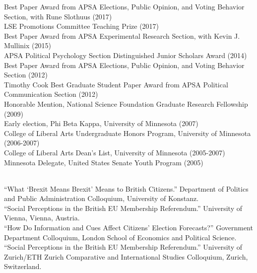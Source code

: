 \documentclass[12pt]{article}
\renewcommand{\section}[1]{\pagebreak[3]%
    \llap{\scshape\smash{\parbox[t]{\marginparwidth}{\raggedright {\color{lg}#1}}}}%
    \vspace{-\baselineskip}\par}
\newcommand{\topic}[1]{\pagebreak[3]\indent {\color{lg}{\footnotesize #1 }}\\}
\newcommand{\entry}[1]{\indent {\color{lg}\guillemotright}\hspace{2pt}#1\vspace{.25em}\\}
\begin{document}
\section{Honors \&\\Awards}
	\entry{Best Paper Award from APSA Elections, Public Opinion, and Voting Behavior Section, with Rune Slothuus (2017)}
	\entry{LSE Promotions Committee Teaching Prize (2017)}
    \entry{Best Paper Award from APSA Experimental Research Section, with Kevin J. Mullinix (2015)}
	\entry{APSA Political Psychology Section Distinguished Junior Scholars Award (2014)}
	\entry{Best Paper Award from APSA Elections, Public Opinion, and Voting Behavior Section (2012)}
	\entry{Timothy Cook Best Graduate Student Paper Award from APSA Political Communication Section (2012)}
	\entry{Honorable Mention, National Science Foundation Graduate Research Fellowship (2009)}
	\entry{Early election, Phi Beta Kappa, University of Minnesota (2007)}
	\entry{College of Liberal Arts Undergraduate Honors Program, University of Minnesota (2006-2007)}
	\entry{College of Liberal Arts Dean's List, University of Minnesota (2005-2007)}
	\entry{Minnesota Delegate, United States Senate Youth Program (2005)}

\section{Invited\\Presentations\\\& Conference\\Papers}

    \topic{Invited Presentations (2017)}
	\entry{``What `Brexit Means Brexit' Means to British Citizens.'' Department of Politics and Public Administration Colloquium, University of Konstanz.}
    \entry{``Social Perceptions in the British EU Membership Referendum.'' University of Vienna, Vienna, Austria.}
    \entry{``How Do Information and Cues Affect Citizens' Election Forecasts?'' Government Department Colloquium, London School of Economics and Political Science.}
    \entry{``Social Perceptions in the British EU Membership Referendum.'' University of Zurich/ETH Zurich Comparative and International Studies Colloquium, Zurich, Switzerland.}
	
\end{document}
